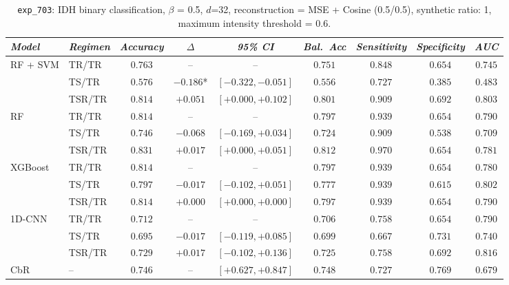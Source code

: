 \begin{table}[H]
\centering
\scriptsize

\label{tab:ctrl_exp_703}
\begin{tabular*}{\textwidth}{@{\extracolsep{\fill}}llccccccc}
\toprule
\emph{Model} & \emph{Regimen} & \emph{Accuracy} & \emph{$\Delta$} & \emph{95\% CI} & \emph{Bal.\ Acc} & \emph{Sensitivity} & \emph{Specificity} & \emph{AUC}\\
\midrule
\multirow{3}{*}{RF + SVM} & TR/TR & $0.763$ & -- & -- & $0.751$ & $0.848$ & $0.654$ & $0.745$\\
 & TS/TR & $0.576$ & $-0.186$* & $[-0.322, -0.051]$ & $0.556$ & $0.727$ & $0.385$ & $0.483$\\
 & TSR/TR & $0.814$ & $+0.051$ & $[+0.000, +0.102]$ & $0.801$ & $0.909$ & $0.692$ & $0.803$\\
\midrule
\multirow{3}{*}{RF} & TR/TR & $0.814$ & -- & -- & $0.797$ & $0.939$ & $0.654$ & $0.790$\\
 & TS/TR & $0.746$ & $-0.068$ & $[-0.169, +0.034]$ & $0.724$ & $0.909$ & $0.538$ & $0.709$\\
 & TSR/TR & $0.831$ & $+0.017$ & $[+0.000, +0.051]$ & $0.812$ & $0.970$ & $0.654$ & $0.781$\\
\midrule
\multirow{3}{*}{XGBoost} & TR/TR & $0.814$ & -- & -- & $0.797$ & $0.939$ & $0.654$ & $0.780$\\
 & TS/TR & $0.797$ & $-0.017$ & $[-0.102, +0.051]$ & $0.777$ & $0.939$ & $0.615$ & $0.802$\\
 & TSR/TR & $0.814$ & $+0.000$ & $[+0.000, +0.000]$ & $0.797$ & $0.939$ & $0.654$ & $0.790$\\
\midrule
\multirow{3}{*}{1D-CNN} & TR/TR & $0.712$ & -- & -- & $0.706$ & $0.758$ & $0.654$ & $0.790$\\
 & TS/TR & $0.695$ & $-0.017$ & $[-0.119, +0.085]$ & $0.699$ & $0.667$ & $0.731$ & $0.740$\\
 & TSR/TR & $0.729$ & $+0.017$ & $[-0.102, +0.136]$ & $0.725$ & $0.758$ & $0.692$ & $0.816$\\
\midrule
CbR & -- & $0.746$ & -- & $[+0.627, +0.847]$ & $0.748$ & $0.727$ & $0.769$ & $0.679$\\
\bottomrule
\end{tabular*}
\caption{\small \texttt{exp\_703}: IDH binary classification, $\beta$ = 0.5, $d$=32, reconstruction = MSE + Cosine (0.5/0.5), synthetic ratio: 1, maximum intensity threshold = 0.6.}
\end{table}

